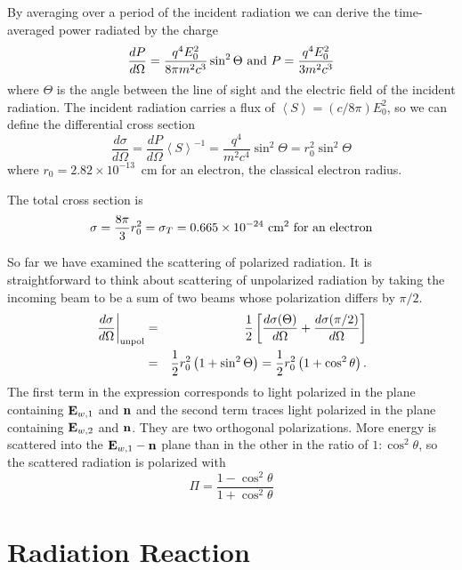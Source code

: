 By averaging over a period of the incident radiation we can derive the
time-averaged power radiated by the charge
\begin{equation}
\frac{dP}{d\Omega} = \frac{q^4 E_0^2}{8\pi m^2 c^3} \sin^2
\Theta~\hbox{\rm and}~P=\frac{q^4 E_0^2}{3m^2 c^3}
\label{eq:237}
\end{equation}
where $\Theta$ is the angle between the line of sight and the electric
field of the incident radiation.  The incident radiation carries a
flux of $\left \langle S \right \rangle = (c/8\pi) E_0^2$, so we can
define the differential cross section
\begin{equation}
\frac{d \sigma}{d\Omega} = \frac{d P}{d\Omega} \left \langle S \right
\rangle^{-1}=\frac{q^4}{m^2 c^4} \sin^2 \Theta = r_0^2 \sin^2 \Theta
\label{eq:238}
\end{equation}
where $r_0=2.82\times 10^{-13}$~cm for an electron, the classical electron radius.

The total cross section is
\begin{equation}
\sigma = \frac{8\pi}{3} r_0^2 = \sigma_T = 0.665 \times
10^{-24}~\hbox{\rm cm}^2~\hbox{\rm for an electron}
\label{eq:239}
\end{equation}

So far we have examined the scattering of polarized radiation.  It is
straightforward to think about scattering of unpolarized radiation by
taking the incoming beam to be a sum of two beams whose polarization
differs by $\pi/2$.
\begin{eqnarray}
\left . \frac{d\sigma}{d\Omega} \right |_{\hbox{\rm \scriptsize unpol}} &=& \frac{1}{2}
\left [ \frac{d\sigma(\Theta)}{d\Omega}  +
  \frac{d\sigma(\pi/2)}{d\Omega}  \right ] \\
&=& \frac{1}{2} r_0^2 \left ( 1 + \sin^2 \Theta \right ) = \frac{1}{2}
r_0^2 \left ( 1 + \cos^2 \theta \right ).
\label{eq:240}
\end{eqnarray}
The first term in the expression corresponds to light polarized in the
plane containing ${\bf E}_{w,1}$ and ${\bf n}$ and the second term
traces light polarized in  the
plane containing ${\bf E}_{w,2}$ and ${\bf n}$.   They are two
orthogonal polarizations.   More energy is scattered into the ${\bf
  E}_{w,1}-{\bf n}$ plane than in the other in the ratio of $1:\cos^2
\theta$, so the scattered radiation is polarized with
\begin{equation}
\Pi = \frac{1-\cos^2\theta}{1+\cos^2\theta}
\label{eq:241}
\end{equation}

\section{Radiation Reaction}
\label{sec:radiation-reaction}

